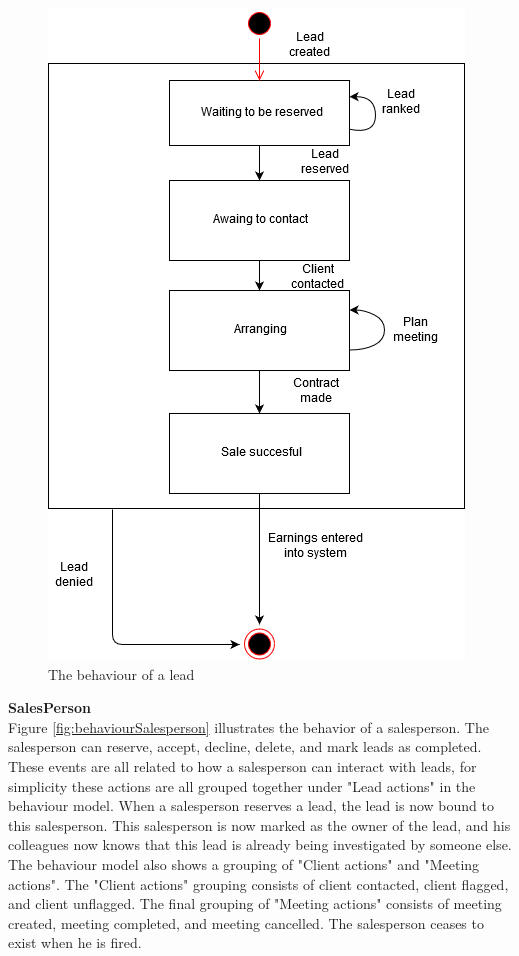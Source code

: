 \begin{figure}[H]
    \centering
    \includegraphics[scale=0.8, clip]{figures/Behaviors/BehaviorLead.png}
    \caption{The behaviour of a lead}
    \label{fig:behaviourLead}
\end{figure}


\noindent
\textbf{SalesPerson}
\\
Figure \ref{fig:behaviourSalesperson} illustrates the behavior of a salesperson. The salesperson can reserve, accept, decline, delete, and mark leads as completed. These events are all related to how a salesperson can interact with leads, for simplicity these actions are all grouped together under "Lead actions" in the behaviour model. When a salesperson reserves a lead, the lead is now bound to this salesperson. This salesperson is now marked as the owner of the lead, and his colleagues now knows that this lead is already being investigated by someone else. The behaviour model also shows a grouping of "Client actions" and "Meeting actions". The "Client actions" grouping consists of client contacted, client flagged, and client unflagged. The final grouping of "Meeting actions" consists of meeting created, meeting completed, and meeting cancelled. The salesperson ceases to exist when he is fired.


